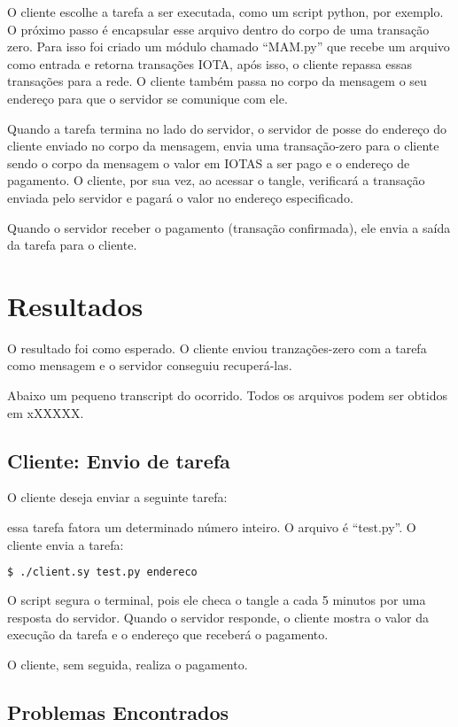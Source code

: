\documentclass[a4paper]{article}
\begin{document}
O cliente escolhe a tarefa a ser executada, como um script python, por exemplo. O próximo passo é encapsular esse arquivo dentro
do corpo de uma transação zero. Para isso foi criado um módulo chamado ``MAM.py'' que recebe um arquivo como entrada e retorna
transações IOTA, após isso, o cliente repassa essas transações para a rede. O cliente também passa no corpo da mensagem o
seu endereço para que o servidor se comunique com ele.

Quando a tarefa termina no lado do servidor, o servidor de posse do endereço do cliente enviado no corpo da mensagem, envia uma
transação-zero para o cliente sendo o corpo da mensagem o valor em IOTAS a ser pago e o endereço de pagamento. O cliente, por sua vez,
ao acessar o tangle, verificará a transação enviada pelo servidor e pagará o valor no endereço especificado.

Quando o servidor receber o pagamento (transação confirmada), ele envia a saída da tarefa para o cliente.

\section{Resultados}\label{sec:Output}

O resultado foi como esperado. O cliente enviou tranzações-zero com a tarefa como mensagem e o servidor conseguiu recuperá-las.

Abaixo um pequeno transcript do ocorrido. Todos os arquivos podem ser obtidos em xXXXXX.

\subsection{Cliente: Envio de tarefa}

O cliente deseja enviar a seguinte tarefa:

essa tarefa fatora um determinado número inteiro. O arquivo é ``test.py''. O cliente envia a tarefa:

\begin{lstlisting}[language=bash]
  $ ./client.sy test.py endereco
\end{lstlisting}

O script segura o terminal, pois ele checa o tangle a cada 5 minutos por uma resposta do servidor. Quando o servidor responde,
o cliente mostra o valor da execução da tarefa e o endereço que receberá o pagamento.

O cliente, sem seguida, realiza o pagamento.


\subsection{Problemas Encontrados}
\end{document}
